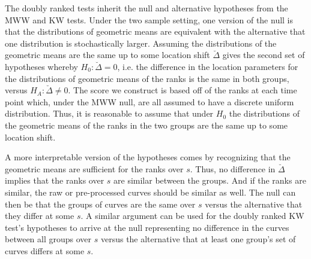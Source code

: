 \documentclass[12pt]{article}
\theoremstyle{plain}
\begin{document}
The doubly ranked tests inherit the null and alternative hypotheses from the MWW and KW tests. Under the two sample setting, one version of the null is that the distributions of geometric means are equivalent with the alternative that one distribution is stochastically larger. Assuming the distributions of the geometric means are the same up to some location shift $\breve{\Delta}$ gives the second set of hypotheses whereby $H_0 : \breve{\Delta} = 0$, i.e. the difference in the location parameters for the distributions of geometric means of the ranks is the same in both groups, versus $H_A : \breve{\Delta} \neq 0$. The score we construct is based off of the ranks at each time point which, under the MWW null, are all assumed to have a discrete uniform distribution. Thus, it is reasonable to assume that under $H_0$ the distributions of the geometric means of the ranks in the two groups are the same up to some location shift.

A more interpretable version of the hypotheses comes by recognizing that the geometric means are sufficient for the ranks over $s$. Thus, no difference in $\breve{\Delta}$ implies that the ranks over $s$ are similar between the groups. And if the ranks are similar, the raw or pre-processed curves should be similar as well. The null can then be that the groups of curves are the same over $s$ versus the alternative that they differ at some $s$. A similar argument can be used for the doubly ranked KW test's hypotheses to arrive at the null representing no difference in the curves between all groups over $s$ versus the alternative that at least one group's set of curves differs at some $s$.

%
\end{document}
